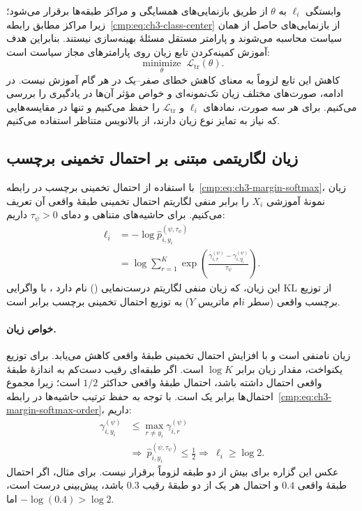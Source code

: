 وابستگی $\ell_i$ به $\theta$ از طریق بازنمایی‌های
همسایگی و مراکز طبقه‌ها برقرار می‌شود؛ زیرا مراکز
مطابق رابطه~\eqref{cmp:eq:ch3-class-center} از
بازنمایی‌های حاصل از همان سیاست محاسبه می‌شوند
و پارامتر مستقل مسئلهٔ بهینه‌سازی نیستند.
بنابراین هدف آموزش کمینه‌کردن تابع زیان روی
پارامترهای مجاز سیاست است:
\begin{equation}\label{cmp:eq:ch3-training-minimization}
\boxed{\underset{\theta}{\operatorname{minimize}}\;
\mathcal L_{\mathrm{tr}}(\theta).}
\end{equation}
کاهش این تابع لزوماً به معنای کاهش خطای
صفر--یک در هر گام آموزش نیست.
در ادامه، صورت‌های مختلف زیان تک‌نمونه‌ای
و خواص مؤثر آن‌ها در یادگیری را بررسی می‌کنیم.
برای هر سه صورت، نمادهای $\ell_i$ و
$\mathcal L_{\mathrm{tr}}$ را حفظ می‌کنیم و تنها
در مقایسه‌هایی که نیاز به تمایز نوع زیان دارند،
از بالانویس متناظر استفاده می‌کنیم.

\subsection{زیان لگاریتمی مبتنی بر احتمال تخمینی برچسب}
\label{cmp:subsec:ch3-training-probability-loss}

با استفاده از احتمال تخمینی برچسب در
رابطه~\eqref{cmp:eq:ch3-margin-softmax}، زیان نمونهٔ
آموزشی $X_i$ را برابر منفی لگاریتم احتمال تخمینی
طبقهٔ واقعی آن تعریف می‌کنیم. برای حاشیه‌های متناهی
و دمای $\tau_\psi>0$ داریم:
\begin{equation}\label{cmp:eq:ch3-training-margin-nll}
\boxed{
\begin{aligned}
\ell_i
&=-\log\widehat p_{i,y_i}^{(\psi,\tau_\psi)}\\
&=\log\sum_{r=1}^{K}
\exp\left(\frac{\gamma_{i,r}^{(\psi)}
-\gamma_{i,y_i}^{(\psi)}}{\tau_\psi}\right).
\end{aligned}}
\end{equation}
این زیان، که زیان منفی لگاریتم درست‌نمایی
() نام دارد \cite{GoodfellowBengioCourville2016DeepLearning}، با واگرایی KL از توزیع
برچسب واقعی (سطر $i$ام ماتریس $Y$) به توزیع
احتمال تخمینی برچسب برابر است.

\paragraph{خواص زیان.}
زیان نامنفی است و با افزایش احتمال تخمینی طبقهٔ
واقعی کاهش می‌یابد. برای توزیع یکنواخت، مقدار
زیان برابر $\log K$ است.
اگر طبقه‌ای رقیب دست‌کم به اندازهٔ طبقهٔ واقعی
احتمال داشته باشد، احتمال طبقهٔ واقعی حداکثر
$1/2$ است؛ زیرا مجموع احتمال‌ها برابر یک است.
با توجه به حفظ ترتیب حاشیه‌ها در
رابطه~\eqref{cmp:eq:ch3-margin-softmax-order}، داریم:
\begin{equation}\label{cmp:eq:ch3-training-nll-error-bound}
\begin{aligned}
\gamma_{i,y_i}^{(\psi)}
&\le\max_{r\ne y_i}\gamma_{i,r}^{(\psi)}\\
&\Longrightarrow\
\widehat p_{i,y_i}^{(\psi,\tau_\psi)}\le\frac12
\Longrightarrow\ \ell_i\ge\log2.
\end{aligned}
\end{equation}
عکس این گزاره برای بیش از دو طبقه لزوماً برقرار
نیست. برای مثال، اگر احتمال طبقهٔ واقعی $0.4$
و احتمال هر یک از دو طبقهٔ رقیب $0.3$ باشد،
پیش‌بینی درست است، اما $-\log(0.4)>\log2$.

